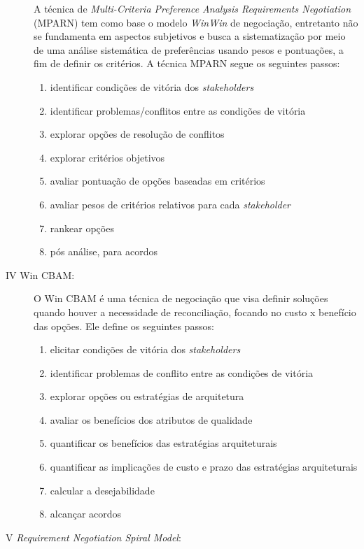 \begin{description}
A técnica de \textit{Multi-Criteria Preference Analysis Requirements
Negotiation} (MPARN) tem como base o modelo \textit{WinWin} de negociação,
entretanto não se fundamenta em aspectos subjetivos e busca a sistematização por meio de uma
análise sistemática de preferências usando pesos e pontuações, a fim de definir
os critérios. A técnica MPARN segue os seguintes passos:

 \begin{enumerate}
\item identificar condições de vitória dos \textit{stakeholders}
\item identificar problemas/conflitos entre as condições de vitória
\item explorar opções de resolução de conflitos
\item explorar critérios objetivos
\item avaliar pontuação de opções baseadas em critérios
\item avaliar pesos de critérios relativos para cada \textit{stakeholder}
\item rankear opções
\item pós análise, para acordos
 \end{enumerate}

\item [IV Win CBAM:]

O Win CBAM é uma técnica de negociação que visa definir soluções quando houver a
necessidade de reconciliação, focando no custo x benefício das opções. Ele
define os seguintes passos:

 \begin{enumerate}
\item elicitar condições de vitória dos \textit{stakeholders}
\item identificar problemas de conflito entre as condições de vitória
\item explorar opções ou estratégias de arquitetura
\item avaliar os benefícios dos atributos de qualidade
\item quantificar os benefícios das estratégias arquiteturais
\item quantificar as implicações de custo e prazo das estratégias arquiteturais
\item calcular a desejabilidade
\item alcançar acordos
 \end{enumerate}

\item [V \textit{Requirement Negotiation Spiral Model}:]


\end{description}
